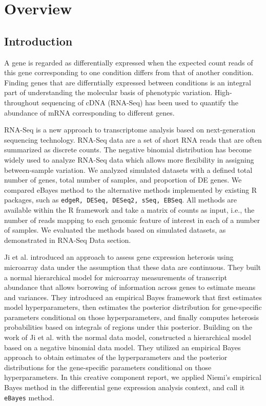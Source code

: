 \chapter{Overview}



\section{Introduction}

A gene is regarded as differentially expressed when the expected count reads of this gene corresponding to one condition differs from that of another condition. Finding genes that are differntially expressed between conditions is an integral part of understanding the molecular basis of phenotypic variation. High-throughout sequencing of cDNA (RNA-Seq) has been used to quantify the abundance of mRNA corresponding to different genes\citep{soneson2013comparison}.


RNA-Seq is a new approach to transcriptome analysis based on next-generation sequencing technology. RNA-Seq data are a set of short RNA reads that are often summarized as discrete counts. The negative binomial distribution has become widely used to analyze RNA-Seq data which allows more flexibility in assigning between-sample variation\citep{ching2014power}. We analyzed simulated datasets with a defined total number of genes, total number of samples, and proportion of DE genes. We compared eBayes\citep{niemi2015empirical} method to the alternative methods implemented by existing R packages, such as {\tt edgeR, DESeq, DESeq2, sSeq, EBSeq}. All methods are available within the R framework and take a matrix of counts as input, i.e., the number of reads mapping to each genomic feature of interest in each of a number of samples. We evaluated the methods based on simulated datasets, as demonstrated in RNA-Seq Data section. 


Ji et al. \citep{ji2014estimation} introduced an approach to assess gene expression heterosis using microarray data under the assumption that these data are continuous. They built a normal hierarchical model for microarray measurements of transcript abundance that allows borrowing of information across genes to estimate means and variances. They introduced an empirical Bayes framework that first estimates model hyperparameters, then estimates the posterior distribution for gene-specific parameters conditional on those hyperparameters, and finally computes heterosis probabilities based on integrals of regions under this posterior. Building on the work of Ji et al. with the normal data model, \citep{niemi2015empirical} constructed a hierarchical model based on a negative binomial data model. They utilized an empirical Bayes approach to obtain estimates of the hyperparameters and the posterior distributions for the gene-specific parameters conditional on those hyperparameters. In this creative component report, we applied Niemi's empirical Bayes method in the differential gene expression analysis context, and call it {\tt eBayes} method. 

